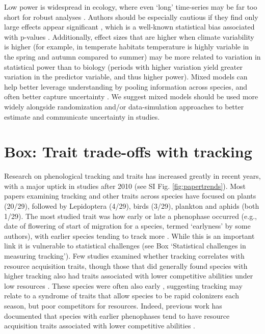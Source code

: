 \documentclass[11pt,letterpaper]{article}
\begin{document}
Low power is widespread in ecology, where even `long' time-series may be far too short for robust analyses \citep{bolmgren2013,kharouba2018}. Authors should be especially cautious if they find only large effects appear significant \citep[e.g.,][]{CaraDonna2014}, which is a well-known statistical bias associated with p-values \citep{loken2017}. Additionally, effect sizes that are higher when climate variability is higher (for example, in temperate habitats temperature is highly variable in the spring and autumn compared to summer) may be more related to variation in statistical power than to biology (periods with higher variation yield greater variation in the predictor variable, and thus higher power). Mixed models can help better leverage understanding by pooling information across species, and often better capture uncertainty \citep{pearse2017}. We suggest mixed models should be used more widely alongside randomization and/or data-simulation approaches \citep[e.g.,][]{bolmgren2013,kharouba2018} to better estimate and communicate uncertainty in studies. 


\section{Box: Trait trade-offs with tracking}
Research on phenological tracking and traits has increased greatly in recent years, with a major uptick in studies after 2010 (see SI Fig. \ref{fig:papertrends}). Most papers examining tracking and other traits across species have focused on plants (20/29), followed by Lepidoptera (4/29), birds (3/29), plankton and aphids (both 1/29). The most studied trait was how early or late a phenophase occurred (e.g., date of flowering of start of migration for a species, termed `earlyness' by some authors), with earlier species tending to track more \citep[studies included both birds and Lepidotera,][]{Diamond:2011nx,Ishioka2013,kharouba2014,jing2016,du2017}. While this is an important link it is vulnerable to statistical challenges (see Box `Statistical challenges in measuring tracking'). Few studies examined whether tracking correlates with resource acquisition traits, though those that did generally found species with higher tracking also had traits associated with lower competitive abilities under low resources \citep[e.g., being shallower or lacking a taproot rooted][]{Dorji2013,lasky2016,Zhu2016BioLetters}. These species were often also early \citep[e.g.,][]{Dorji2013,Zhu2016BioLetters}, suggesting tracking may relate to a syndrome of traits that allow species to be rapid colonizers each season, but poor competitors for resources. Indeed, previous work has documented that species with earlier phenophases tend to have resource acquisition traits associated with lower competitive abilities \citep[e.g., they tend to be of lower height, have shallower roots, narrower diameter vessels, thinner leaves, and grow faster, reviewed in][]{wolkovich2014aob}. 
\end{document}
